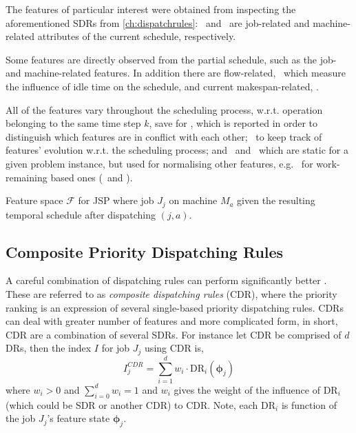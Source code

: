\documentclass[smallextended]{svjour3}
\renewcommand{\vphi}{\bm \phi}
\begin{document}
The features of particular interest were obtained from inspecting the aforementioned SDRs from \cref{ch:dispatchrules}:  
\phiJobRelated\ and \phiMacRelated\ are job-related and machine-related attributes of the current schedule, respectively. 

Some features are directly observed from the partial schedule, such as the job- and machine-related features. 
In addition there are 
flow-related, \phiFlowRelated\, which measure the influence of idle time on the schedule, 
and current makespan-related, \phiScheduleRelated.

All of the features vary throughout the scheduling process, w.r.t. operation belonging to the same time step $k$, save for \phimac, 
which is reported in order to distinguish which features are in conflict with each other; \phistep\ to keep track of features' evolution w.r.t. the scheduling process; and \phitotalProc\ and \phiwrmTotal\ which are static for a given problem instance, but used for normalising other features, e.g. \phiwrmTotal\ for  work-remaining based ones (\phiwrmJob\ and \phiwrmMac). 

\begin{table}[t]  \centering
  \caption[Feature space $\mathcal{F}$ for JSP]{Feature space $\mathcal{F}$ for JSP where job $J_j$ on machine $M_a$ given the resulting temporal schedule after dispatching $(j,a)$.
  }
  \label{tbl:jssp:feat}
  
\end{table}

\subsection{Composite Priority Dispatching Rules}\label{sec:CDR}
A careful combination of dispatching rules can perform significantly better \cite{Jayamohan04}. These are referred to as \emph{composite dispatching rules} (CDR), where the priority ranking is an expression of several single-based priority dispatching rules. CDRs can deal with greater number of features and more complicated form, in short, CDR are a combination of several SDRs. For instance let CDR be comprised of $d$ DRs, then the index $I$ for job $J_j$ using CDR is, 
\begin{equation}
I_j^{CDR} = \sum_{i=1}^d w_i \cdot \text{DR}_i(\vphi_j) \label{eq:CDR}
\end{equation}
where $w_i>0$ and $\sum_{i=0}^d w_i = 1$ and $w_i$ gives the weight of the influence of $\text{DR}_i$ (which could be SDR or another CDR) to CDR. Note, each $\text{DR}_i$ is function of the job $J_j$'s feature state $\vphi_j$.
\end{document}
